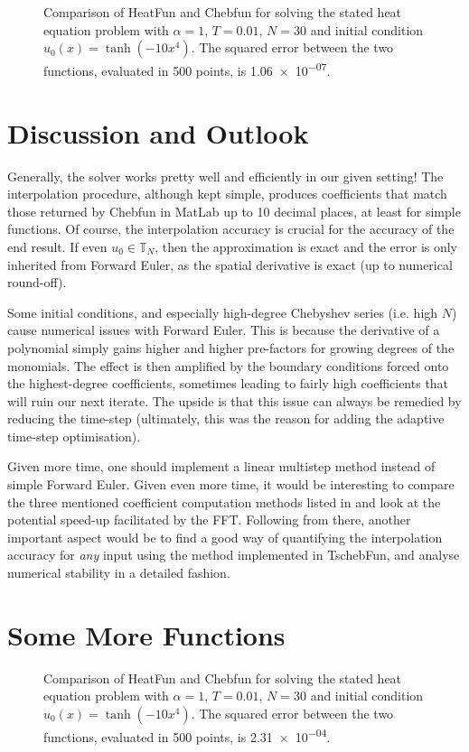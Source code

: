 \documentclass[12pt, a4paper]{article}
\newcommand{\chebyshev}{Chebyshev\xspace}
\newcommand{\tschebfun}{\textcolor{themecolor3}{TschebFun}\xspace}
\newcommand{\heatfun}{\textcolor{themecolor3}{HeatFun}\xspace}
\begin{document}
  \begin{figure}[H]
    \centering
    \caption{Comparison of \heatfun and Chebfun for solving the stated heat equation problem with $\alpha = 1$, $T = 0.01$, $N = 30$ and initial condition $u_0(x) = \tanh(-10x^4)$. The squared error between the two functions, evaluated in 500 points, is \num{1.06e-07}.}
  \end{figure}

  \section{Discussion and Outlook}
  Generally, the solver works pretty well and efficiently in our given setting!
  The interpolation procedure, although kept simple, produces coefficients that match those returned by Chebfun in MatLab up to 10 decimal places, at least for simple functions.
  Of course, the interpolation accuracy is crucial for the accuracy of the end result.
  If even $u_0 \in \mathbb{T}_N$, then the approximation is exact and the error is only inherited from Forward Euler, as the spatial derivative is exact (up to numerical round-off).

  Some initial conditions, and especially high-degree \chebyshev series (i.e. high $N$) cause numerical issues with Forward Euler.
  This is because the derivative of a polynomial simply gains higher and higher pre-factors for growing degrees of the monomials.
  The effect is then amplified by the boundary conditions forced onto the highest-degree coefficients, sometimes leading to fairly high coefficients that will ruin our next iterate.
  The upside is that this issue can always be remedied by reducing the time-step (ultimately, this was the reason for adding the adaptive time-step optimisation).

  Given more time, one should implement a linear multistep method instead of simple Forward Euler.
  Given even more time, it would be interesting to compare the three mentioned coefficient computation methods listed in  and look at the potential speed-up facilitated by the FFT.
  Following from there, another important aspect would be to find a good way of quantifying the interpolation accuracy for \textit{any} input using the method implemented in \tschebfun, and analyse numerical stability in a detailed fashion.

  \printbibliography

  \appendix
  \section{Some More Functions}
  \begin{figure}[H]
    \centering
    \caption{Comparison of \heatfun and Chebfun for solving the stated heat equation problem with $\alpha = 1$, $T = 0.01$, $N = 30$ and initial condition $u_0(x) = \tanh(-10x^4)$. The squared error between the two functions, evaluated in 500 points, is \num{2.31e-04}.}
  \end{figure}
\end{document}
